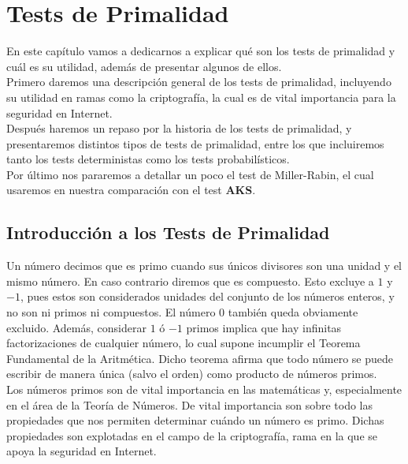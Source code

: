 \chapter{Tests de Primalidad}

En este capítulo vamos a dedicarnos a explicar qué son los tests de primalidad y cuál es su utilidad, además de presentar algunos de ellos.\\

Primero daremos una descripción general de los tests de primalidad, incluyendo su utilidad en ramas como la criptografía, la cual es de vital importancia para la seguridad en Internet.\\

Después haremos un repaso por la historia de los tests de primalidad, y presentaremos distintos tipos de tests de primalidad, entre los que incluiremos tanto los tests deterministas como los tests probabilísticos.\\

Por último nos pararemos a detallar un poco el test de Miller-Rabin, el cual usaremos en nuestra comparación con el test \textbf{AKS}.

\section{Introducción a los Tests de Primalidad}

Un número decimos que es primo cuando sus únicos divisores son una unidad y el mismo número. En caso contrario diremos que es compuesto. Esto excluye a $1$ y $-1$, pues estos son considerados unidades del conjunto de los números enteros, y no son ni primos ni compuestos. El número $0$ también queda obviamente excluido. Además, considerar $1$ ó $-1$ primos implica que hay infinitas factorizaciones de cualquier número, lo cual supone incumplir el Teorema Fundamental de la Aritmética. Dicho teorema afirma que todo número se puede escribir de manera única (salvo el orden) como producto de números primos.\\

Los números primos son de vital importancia en las matemáticas y, especialmente en el área de la Teoría de Números. De vital importancia son sobre todo las propiedades que nos permiten determinar cuándo un número es primo. Dichas propiedades son explotadas en el campo de la criptografía, rama en la que se apoya la seguridad en Internet.\\

